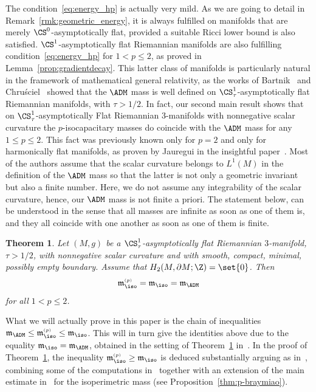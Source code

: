 \documentclass[10pt,a4paper]{amsart}
\numberwithin{equation}{section}
\newtheorem{Theorem}{Theorem}[section]
\newcommand{\ma}{\mathfrak{m}}
\newcommand{\tp}[1][p]{{\text{\tiny$(#1)$}}}
\begin{document}
The condition~\eqref{eq:energy_hp} is actually very mild. As we are going to detail in Remark~\ref{rmk:geometric_energy}, it is always fulfilled on manifolds that are merely $\CS^0$-asymptotically flat, provided a suitable Ricci lower bound is also satisfied. $\CS^1$-asymptotically flat Riemannian manifolds are also fulfilling condition~\eqref{eq:energy_hp} for $1<p\leq 2$, as proved in Lemma~\ref{prop:gradientdecay}. This latter class of manifolds is particularly natural in the framework of mathematical general relativity, as the works of Bartnik~\cite{bartnik_massasymptoticallyflatmanifold_1986} and Chru\'sciel~\cite{chrusciel_boundaryconditionsspatialinfinity_1986} showed that the $\ADM$ mass is well defined on $\CS^1_\tau$-asymptotically flat Riemannian manifolds, with $\tau >1/2$. In fact, our second main result shows that on $\CS^1_\tau$-asymptotically Flat Riemannian $3$-manifolds with nonnegative scalar curvature the $p$-isocapacitary masses do coincide with the $\ADM$ mass for any $1 \leq p \leq 2$. This fact was previously known only for $p = 2$ and only for harmonically flat manifolds, as proven by Jauregui in the insightful paper~\cite[Corollary~8]{jauregui_admmasscapacityvolumedeficit_2020}. Most of the authors assume that the scalar curvature belongs to $L^1(M)$ in the definition of the $\ADM$ mass so that the latter is not only a geometric invariant but also a finite number. Here, we do not assume any integrability of the scalar curvature, hence, our $\ADM$ mass is not finite a priori. The statement below, can be understood in the sense that all masses are infinite as soon as one of them is, and they all coincide with one another as soon as one of them is finite.


\begin{Theorem}\label{thm:equivalence-masses}
 Let $(M,g)$ be a $\CS^1_\tau$-asymptotically flat Riemannian $3$-manifold, $\tau >1/2$, with nonnegative scalar curvature and with smooth, compact, minimal, possibly empty boundary. Assume that $H_2(M,\partial M ; \Z)=\set{0}$. Then
 \[
 \ma^{\tp}_{\iso}=\ma_{\iso} = \ma_{\ADM}
 \]
 for all $1<p\leq 2 $.
\end{Theorem}

What we will actually prove in this paper is the chain of inequalities $\ma_{\ADM} \leq \ma^{\tp}_{\iso} \leq \ma_{\iso}$. This will in turn give the identities above due to the equality $\ma_{\iso} = \ma_{\ADM}$, obtained in the setting of Theorem~\ref{thm:equivalence-masses} in~\cite[Theorem 4.13]{benatti_isoperimetricriemannianpenroseinequality_2022}.
In the proof of Theorem~\ref{thm:equivalence-masses}, the inequality ${\ma^{\tp}_{\iso}\geq \ma_{\iso}}$ is deduced substantially arguing as in~\cite[Theorem 5]{jauregui_admmasscapacityvolumedeficit_2020}, combining some of the computations in~\cite{fan_largespheresmallspherelimitsbrownyork_2009} together with an extension of the main estimate in~\cite{bray_capacitysurfacesmanifoldsnonnegative_2008,xiao_harmoniccapacityasymptoticallyflat_2016}
for the isoperimetric mass (see Proposition~\ref{thm:p-braymiao}).
\end{document}
